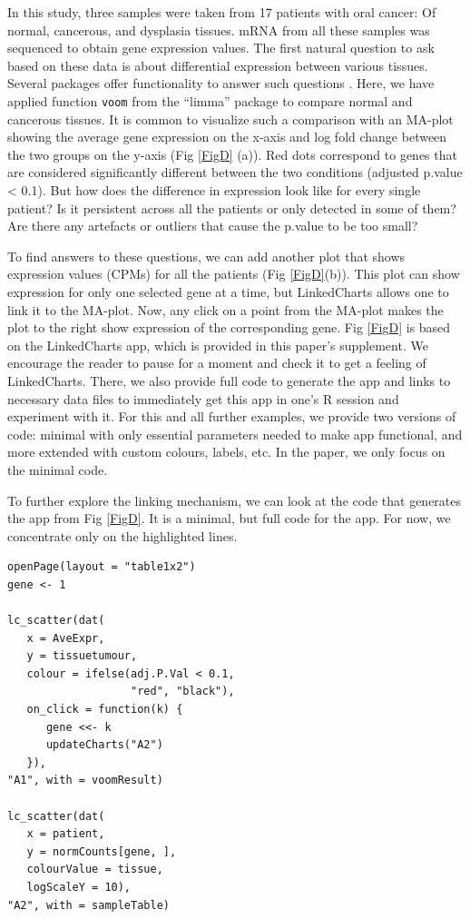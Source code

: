 \documentclass[twocolumn,10pt]{article}
\begin{document}
In this study, three samples were taken from 17 patients with oral cancer: Of normal, cancerous, and dysplasia tissues. mRNA from all these samples was sequenced to obtain gene expression values. The first natural question to ask based on these data is about differential expression between various tissues. Several packages offer functionality to answer such questions  \citep{ritchie_2015, love_2014}. Here, we have applied function \texttt{voom} from the ``limma'' package to compare normal and cancerous tissues. It is common to visualize such a comparison with an MA-plot \citep{dudoit_2002} showing the average gene expression on the x-axis and log fold change between the two groups on the y-axis (Fig \ref{FigD} (a)). Red dots correspond to genes that are considered significantly different between the two conditions (adjusted p.value < 0.1). But how does the difference in expression look like for every single patient? Is it persistent across all the patients or only detected in some of them? Are there any artefacts or outliers that cause the p.value to be too small?

To find answers to these questions, we can add another plot that shows expression values (CPMs) for all the patients (Fig \ref{FigD}(b)). This plot can show expression for only one selected gene at a time, but LinkedCharts allows one to link it to the MA-plot. Now, any click on a point from the MA-plot makes the plot to the right show expression of the corresponding gene. Fig \ref{FigD} is based on the LinkedCharts app, which is provided in this paper's supplement. We encourage the reader to pause for a moment and check it to get a feeling of LinkedCharts. There, we also provide full code to generate the app and links to necessary data files to immediately get this app in one's R session and experiment with it. For this and all further examples, we provide two versions of code: minimal with only essential parameters needed to make app functional, and more extended with custom colours, labels, etc. In the paper, we only focus on the minimal code.

To further explore the linking mechanism, we can look at the code that generates the app from Fig \ref{FigD}. It is a minimal, but full code for the app. For now, we concentrate only on the highlighted lines.

\begin{verbatim}
openPage(layout = "table1x2")
gene <- 1

lc_scatter(dat(
   x = AveExpr,
   y = tissuetumour,
   colour = ifelse(adj.P.Val < 0.1, 
                   "red", "black"),
   on_click = function(k) {
      gene <<- k
      updateCharts("A2")
   }),
"A1", with = voomResult)

lc_scatter(dat(
   x = patient,
   y = normCounts[gene, ],
   colourValue = tissue, 
   logScaleY = 10),
"A2", with = sampleTable)
\end{verbatim}
\end{document}
